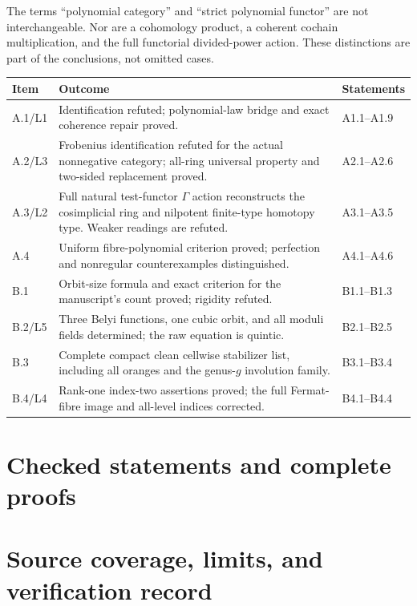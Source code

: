 \documentclass[11pt,a4paper]{article}
\begin{document}
The terms ``polynomial category'' and ``strict polynomial functor''
are not interchangeable. Nor are a cohomology product, a coherent
cochain multiplication, and the full functorial divided-power action.
These distinctions are part of the conclusions, not omitted cases.

\begin{longtable}{@{}p{}p{}p{}@{}}
\toprule
Item & Outcome & Statements\\\midrule
\endhead
A.1/L1 & Identification refuted; polynomial-law bridge and exact coherence repair proved. & A1.1--A1.9\\
A.2/L3 & Frobenius identification refuted for the actual nonnegative category; all-ring universal property and two-sided replacement proved. & A2.1--A2.6\\
A.3/L2 & Full natural test-functor $\Gamma$ action reconstructs the cosimplicial ring and nilpotent finite-type homotopy type. Weaker readings are refuted. & A3.1--A3.5\\
A.4 & Uniform fibre-polynomial criterion proved; perfection and nonregular counterexamples distinguished. & A4.1--A4.6\\
B.1 & Orbit-size formula and exact criterion for the manuscript's count proved; rigidity refuted. & B1.1--B1.3\\
B.2/L5 & Three Belyi functions, one cubic orbit, and all moduli fields determined; the raw equation is quintic. & B2.1--B2.5\\
B.3 & Complete compact clean cellwise stabilizer list, including all oranges and the genus-$g$ involution family. & B3.1--B3.4\\
B.4/L4 & Rank-one index-two assertions proved; the full Fermat-fibre image and all-level indices corrected. & B4.1--B4.4\\
\bottomrule
\end{longtable}

\begingroup
\small
\setlength{\parskip}{0pt}
\tableofcontents
\endgroup
\clearpage
\part{Checked statements and complete proofs}







\clearpage
\part{Source coverage, limits, and verification record}
\end{document}

